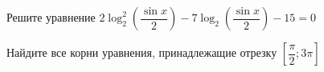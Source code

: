 \begin{ex}
	\begin{condition}
		\begin{enumcols}[label=\asbuk*)]
			\item Решите уравнение \( 2\log_2^2 \left(\dfrac{\sin x}{2}\right) - 7\log_2 \left(\dfrac{\sin x}{2}\right) -15 = 0 \)
			\item Найдите все корни уравнения, принадлежащие отрезку \( \left[\dfrac{\pi}{2};3\pi\right] \)
		\end{enumcols}
	\end{condition}
\end{ex}